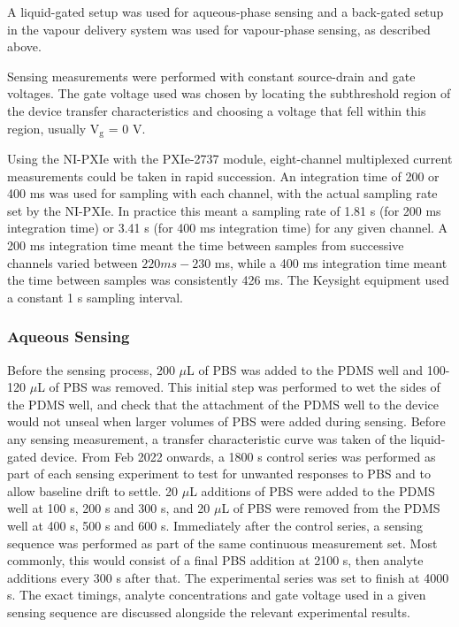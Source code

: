 \documentclass[
  a4paper,
]{scrbook}
\begin{document}
A liquid-gated setup was used for aqueous-phase sensing and a back-gated
setup in the vapour delivery system was used for vapour-phase sensing,
as described above.

Sensing measurements were performed with constant source-drain and gate
voltages. The gate voltage used was chosen by locating the subthreshold
region of the device transfer characteristics and choosing a voltage
that fell within this region, usually V\(_{\mathrm{g}}\) = 0 V.

Using the NI-PXIe with the PXIe-2737 module, eight-channel multiplexed
current measurements could be taken in rapid succession. An integration
time of 200 or 400 ms was used for sampling with each channel, with the
actual sampling rate set by the NI-PXIe. In practice this meant a
sampling rate of 1.81 s (for 200 ms integration time) or 3.41 s (for 400
ms integration time) for any given channel. A 200 ms integration time
meant the time between samples from successive channels varied between
\(220 ms-230\) ms, while a 400 ms integration time meant the time
between samples was consistently 426 ms. The Keysight equipment used a
constant 1 s sampling interval.

\hypertarget{aqueous-sensing}{%
\subsubsection*{Aqueous Sensing}\label{aqueous-sensing}}

Before the sensing process, 200 \(\mu\)L of PBS was added to the PDMS
well and 100-120 \(\mu\)L of PBS was removed. This initial step was
performed to wet the sides of the PDMS well, and check that the
attachment of the PDMS well to the device would not unseal when larger
volumes of PBS were added during sensing. Before any sensing
measurement, a transfer characteristic curve was taken of the
liquid-gated device. From Feb 2022 onwards, a 1800 s control series was
performed as part of each sensing experiment to test for unwanted
responses to PBS and to allow baseline drift to settle. 20 \(\mu\)L
additions of PBS were added to the PDMS well at 100 s, 200 s and 300 s,
and 20 \(\mu\)L of PBS were removed from the PDMS well at 400 s, 500 s
and 600 s. Immediately after the control series, a sensing sequence was
performed as part of the same continuous measurement set. Most commonly,
this would consist of a final PBS addition at 2100 s, then analyte
additions every 300 s after that. The experimental series was set to
finish at 4000 s. The exact timings, analyte concentrations and gate
voltage used in a given sensing sequence are discussed alongside the
relevant experimental results.
\end{document}

